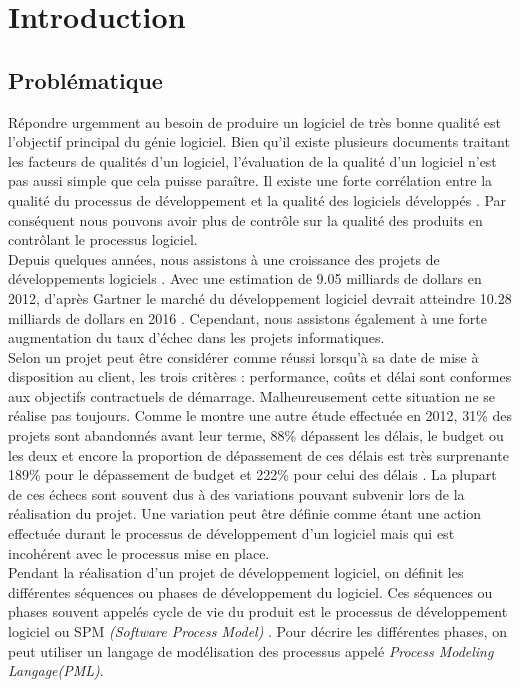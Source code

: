 \chapter{Introduction} %

\label{Chapitre1} %

\section{Problématique}
Répondre urgemment au besoin de produire un logiciel de très bonne qualité est l'objectif principal du génie logiciel. Bien qu'il existe plusieurs documents traitant les facteurs de qualités d'un logiciel, l'évaluation de la qualité d'un logiciel n'est pas aussi simple que cela puisse paraître. Il existe une forte corrélation entre la qualité du processus de développement et la qualité des logiciels développés \cite{wikar}. Par conséquent nous pouvons avoir plus de contrôle sur la qualité des produits en contrôlant le processus logiciel.\\
Depuis quelques années, nous assistons à une croissance des projets de développements logiciels \cite{jdn}. Avec une estimation de 9.05 milliards  de dollars en 2012, d'après Gartner le marché du développement logiciel devrait atteindre 10.28 milliards de dollars en 2016 \cite{01net}. Cependant, nous assistons également à une forte augmentation du taux d'échec dans  les projets informatiques.\\ 
Selon \cite{gdpra} un projet peut être considérer comme réussi lorsqu'à sa date de mise à disposition au client, les trois critères : performance, coûts et délai sont conformes aux objectifs contractuels de démarrage. Malheureusement cette situation ne se réalise pas toujours. Comme le montre une autre étude effectuée en 2012, 31\% des projets sont abandonnés avant leur terme, 88\% dépassent les délais, le budget ou les deux et encore la proportion de dépassement de ces délais est très surprenante 189\% pour le dépassement de budget et 222\% pour celui des délais \cite{pcp}. La plupart de ces échecs sont souvent dus à des variations pouvant subvenir lors de la réalisation du projet. Une variation peut être définie comme étant une  action effectuée durant le processus de développement d'un logiciel mais qui est incohérent avec le processus mise en place.\\
Pendant la réalisation d'un projet de développement logiciel, on définit les différentes séquences ou phases de développement du logiciel. Ces séquences ou phases souvent appelés cycle de vie du produit est le processus de développement logiciel ou SPM \textit{(Software Process Model)} \cite{tse}. Pour décrire les différentes phases, on peut utiliser un langage de modélisation des processus appelé \textit{Process Modeling Langage(PML)}.\\
